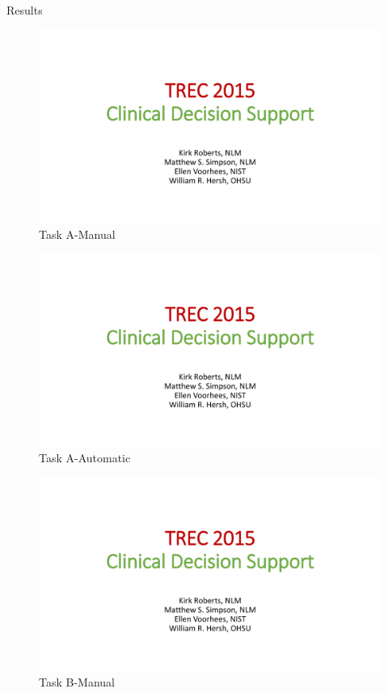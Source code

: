 \documentclass[final]{beamer}
\newlength{\onecolwid}
\begin{document}
\begin{frame}[t]
\begin{columns}[t]
\begin{column}{\onecolwid}
\begin{block}{Results}
  \begin{figure}
    \centering
    \includegraphics[page=12,trim={7cm 0 7cm 7cm},clip]{images/2015-CDS-Results.pdf}
    \caption{Task A-Manual}
  \end{figure}

  \begin{figure}
    \includegraphics[page=13,trim={7cm 0 7cm 7cm},clip]{images/2015-CDS-Results.pdf}
    \caption{Task A-Automatic}
  \end{figure}

  \begin{figure}
    \includegraphics[page=16,trim={7cm 0 7cm 7cm},clip]{images/2015-CDS-Results.pdf}
    \caption{Task B-Manual}
  \end{figure}
\end{block}





\end{column}
\end{columns}
\end{frame}
\end{document}
